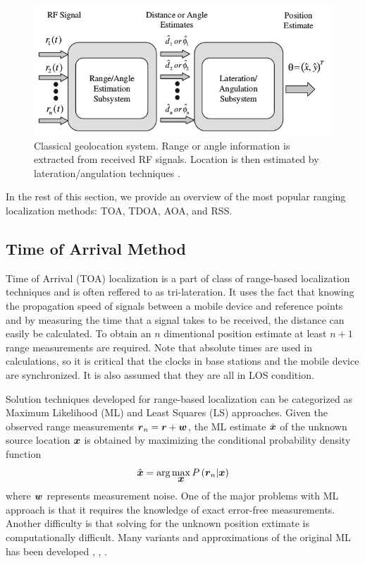 \begin{figure}[h]
\centering
\includegraphics[width=1.0\textwidth]{figures/localization_example.png}
\caption{Classical geolocation system. Range or angle information is extracted from received RF signals. Location is then estimated by lateration/angulation techniques \cite{GeoLoc}.}
\label{fig:2step}
\end{figure}


In the rest of this section, we  provide an overview of the most popular ranging localization methods: TOA, TDOA, AOA, and RSS.



\subsection{Time of Arrival Method}

Time of Arrival (TOA) localization is a part of class of range-based localization techniques and is often reffered to as tri-lateration. It uses the fact that knowing the propagation speed of  signals between a mobile device and reference points and by measuring the time that a signal takes to be received, the distance can easily be calculated. To obtain an $n$  dimentional position estimate at least $n+1$ range measurements are required. Note that absolute times are used in calculations, so it is critical that the  clocks in base stations and the mobile device are synchronized. It is also assumed that they are all in LOS condition. %

Solution techniques developed for range-based localization can be categorized as Maximum Likelihood (ML) and Least Squares (LS) approaches. 
Given the observed range measurements $\mbox{\boldmath$r$}_n = \mbox{\boldmath$r$} + \mbox{\boldmath$w$}$, the ML estimate $\hat{\mbox{\boldmath$x$}}$ of the unknown source location $\mbox{\boldmath$x$}$ is obtained by maximizing the conditional probability density function 
\begin{equation}
\nonumber
\hat{\mbox{\boldmath$x$}} = \mbox{arg}\max_{\mbox{\boldmath$x$}} P\left(\mbox{\boldmath$r$}_n|\mbox{\boldmath$x$}\right)
\end{equation}
where $\mbox{\boldmath$w$}$ represents measurement noise. One of the major problems with ML approach is that it requires the knowledge of exact error-free measurements. Another difficulty is that solving for the unknown position extimate is computationally difficult. Many variants and approximations of the original ML has been  developed \cite{HoML}, \cite{Guvenc2}, \cite{Guvenc}.

